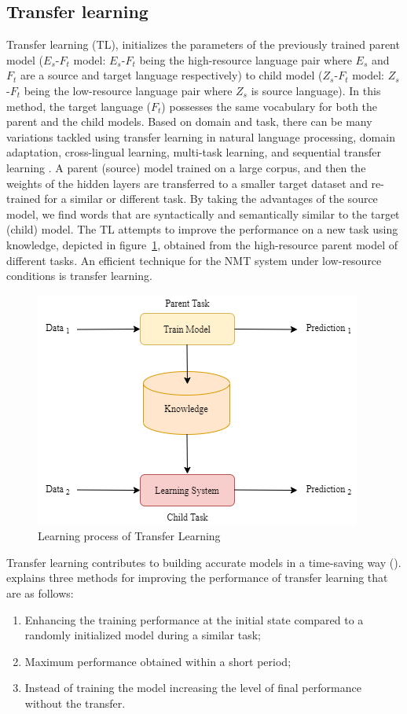 \documentclass[manuscript,screen]{acmart}
\begin{document}
\subsection{Transfer learning}
Transfer learning (TL), initializes the parameters of the previously trained parent model ($E_s$-$F_t$ model: $E_s$-$F_t$ being the high-resource language pair where $E_s$ and $F_t$ are a source and target language respectively) to child model ($Z_s$-$F_t$ model: $Z_s$-$F_t$ being the low-resource language pair where $Z_s$ is source language). In this method, the target language ($F_t$) possesses the same vocabulary for both the parent and the child models. Based on domain and task, there can be many variations tackled using transfer learning in natural language processing, domain adaptation, cross-lingual learning, multi-task learning, and sequential transfer learning \citet{ruder2019transfer}. A parent (source) model trained on a large corpus, and then the weights of the hidden layers are transferred to a smaller target dataset and re-trained for a similar or different task. By taking the advantages of the source model, we find words that are syntactically and semantically similar to the target (child) model. The TL attempts to improve the performance on a new task using knowledge, depicted in figure~\ref{TLfigure}, obtained from the high-resource parent model of different tasks. An efficient technique for the NMT system under low-resource conditions is transfer learning.

\begin{figure}[!h]
  \centering
  \includegraphics[width=0.5\linewidth]{TransferLearning.png}
  \caption{Learning process of Transfer Learning}
  \label{TLfigure}
\end{figure}

Transfer learning contributes to building accurate models in a time-saving way (\citet{rawat2017deep}). \citet{torrey2010transfer} explains three methods for improving the performance of transfer learning that are as follows:
\begin{enumerate}
    \item Enhancing the training performance at the initial state compared to a randomly initialized model during a similar task;
    \item Maximum performance obtained within a short period;
    \item Instead of training the model increasing the level of final performance without the transfer.
\end{enumerate}
\end{document}
